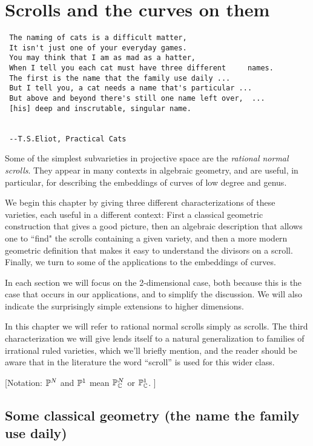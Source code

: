 

\chapter{Scrolls and the curves on them}
\label{ScrollsChapter}

\begin{verbatim}
 The naming of cats is a difficult matter,
 It isn't just one of your everyday games.
 You may think that I am as mad as a hatter,
 When I tell you each cat must have three different 	names.
 The first is the name that the family use daily ...
 But I tell you, a cat needs a name that's particular ...
 But above and beyond there's still one name left over,  ...
 [his] deep and inscrutable, singular name.

 
 --T.S.Eliot, Practical Cats
\end{verbatim}

Some of the simplest subvarieties in projective space are the \emph{rational normal scrolls}. They appear in many contexts in algebraic geometry, and are useful, in particular, for describing the embeddings of curves of low degree and genus. 

We begin this chapter by giving three different characterizations of these varieties, each useful in a different context: First a classical geometric construction that gives a good picture, then an algebraic description that allows one to ``find" the scrolls containing a given variety, and then a more modern geometric definition that makes it easy to understand the divisors on a scroll. Finally, we turn to some of the applications to the embeddings of curves.

In each section we will focus on the 2-dimensional case, both because this is the case that occurs in our applications, and to simplify the discussion. We will also indicate the surprisingly simple extensions to higher dimensions.

In this chapter we will refer to rational normal scrolls simply as scrolls. The third characterization we will give lends itself to a natural generalization to families of irrational ruled varieties, which we'll briefly mention, and the reader should be aware that in the literature the word ``scroll'' is used for this wider class.

[Notation:  ${\mathbb P}^{N}$ and ${\mathbb P}^{1}$ mean ${\mathbb P}_{{\mathbb C}}^{N}$ or ${\mathbb P}_{{\mathbb C}}^{1}$. ]

\section{Some classical geometry (the name the family use daily)}\label{daily name}

